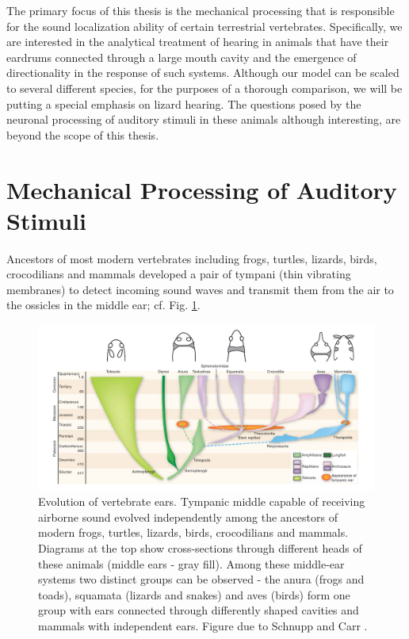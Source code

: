 The primary focus of this thesis is the mechanical processing that is responsible for the
sound localization ability of certain terrestrial vertebrates. Specifically, we are interested
in the analytical treatment of hearing in animals that have their eardrums connected through a large mouth cavity and the emergence of
 directionality in the response of such systems. Although our model can be scaled to several different species,
 for the purposes of a thorough comparison, we will be putting a special emphasis on lizard hearing. The questions posed by the neuronal processing of auditory stimuli in these
animals although interesting, are beyond the scope of this thesis.

\section{Mechanical Processing of Auditory Stimuli}\label{mechanicalprocessing}
Ancestors of most modern vertebrates including frogs, turtles, lizards, birds, crocodilians and mammals
developed a pair of tympani (thin vibrating membranes) to detect incoming sound waves and transmit
them from the air to the ossicles in the middle ear; cf. Fig. \ref{vertebrateearevolution}. 
\begin{figure}
 \includegraphics[width=1.0\linewidth]{Diagrams/vertebrateearevolution.png}
 \caption[Vertebrate Ear Evolution]{Evolution of vertebrate ears. Tympanic
 middle capable of receiving airborne sound evolved independently among the ancestors of modern frogs, turtles, lizards, birds,
 crocodilians and mammals. Diagrams at the top show cross-sections through different heads of these animals (middle ears - gray fill).
 Among these middle-ear systems two distinct groups can be observed - the anura (frogs and toads), squamata (lizards and snakes)
 and aves (birds) form one group with ears connected through differently shaped cavities and mammals with independent ears. Figure due to Schnupp and Carr \cite{schnuppcarr}.}
 \label{vertebrateearevolution}
\end{figure}

